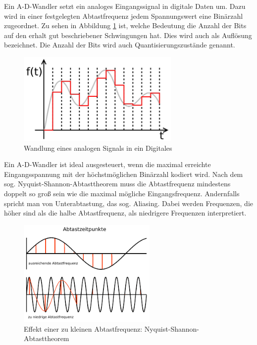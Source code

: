 Ein A-D-Wandler setzt ein analoges Eingangssignal in digitale Daten um. Dazu wird in einer festgelegten Abtastfrequenz jedem Spannungswert eine Binärzahl zugeordnet.
Zu sehen in Abbildung \ref{adw} ist, welche Bedeutung die Anzahl der Bits auf den erhalt gut beschriebener Schwingungen hat. Dies wird auch als Auflösung bezeichnet. Die Anzahl der Bits wird auch Quantisierungszustände genannt.
\begin{figure}[H]
     \centering     
     \includegraphics[width=0.7\textwidth]{Abb/adw.pdf}
     \caption{Wandlung eines analogen Signals in ein Digitales}
     \label{adw}
\end{figure}
Ein A-D-Wandler ist ideal ausgesteuert, wenn die maximal erreichte Eingangsspannung mit der höchstmöglichen Binärzahl kodiert wird. 
Nach dem sog. Nyquist-Shannon-Abtasttheorem muss die Abtastfrequenz mindestens doppelt so groß sein wie die maximal mögliche Eingangsfrequenz. Andernfalls spricht man von Unterabtastung, das sog. Aliasing. Dabei werden Frequenzen, die höher sind als die halbe Abtastfrequenz, als niedrigere Frequenzen interpretiert.
\begin{figure}[H]
    \centering
    \includegraphics[width=0.6\textwidth]{Abb/abtast.pdf} 
    \caption{Effekt einer zu kleinen Abtastfrequenz: Nyquist-Shannon-Abtasttheorem}
\end{figure}

